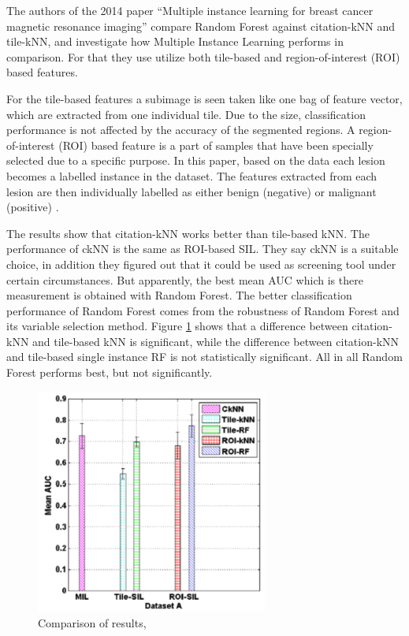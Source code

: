 \documentclass{sig-alternate-05-2015}
\begin{document}
The authors of the 2014  paper ``Multiple instance learning for breast cancer magnetic resonance imaging'' \cite{maken2014multiple} compare Random Forest against citation-kNN and tile-kNN, and investigate how Multiple Instance Learning performs in comparison. For that they use utilize both tile-based  and region-of-interest  (ROI)  based features. 

For the tile-based features  a subimage is seen taken like one bag of feature vector, which are extracted from one individual tile. Due to the size, classification performance is not affected by the accuracy of the segmented regions. A region-of-interest  (ROI)  based feature is a part of samples that have been specially selected due to a specific purpose. In this paper, based on the data each lesion becomes a labelled instance in the dataset. The features extracted from each lesion are then individually labelled as either benign (negative) or malignant (positive)  \cite{maken2014multiple}. 

The results show that citation-kNN works better than tile-based kNN. The performance of ckNN is the same as ROI-based SIL. They say ckNN is a suitable choice, in addition they figured out that it could be used as screening tool under certain circumstances. But apparently, the best mean AUC which is there measurement is obtained with Random Forest. The better classification performance of Random Forest comes from the robustness of Random Forest and its variable selection method. Figure \ref{fig:mildataa} shows that a difference  between  citation-kNN  and  tile-based  kNN is significant, while the  difference between citation-kNN  and  tile-based   single   instance   RF   is   not   statistically   significant.   All in all Random Forest performs best, but not significantly.

\begin{figure}
\centering
\includegraphics[width=3in]{mildataa}
\caption{Comparison of results, \cite{maken2014multiple}}
\label{fig:mildataa}
\end{figure}
\end{document}
